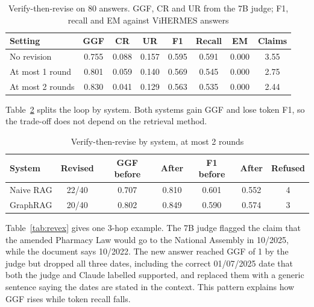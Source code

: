 \documentclass[conference]{IEEEtran}
\begin{document}
\begin{table}[t]
\caption{Verify-then-revise on 80 answers. GGF, CR and UR from the 7B judge; F1, recall and EM against ViHERMES answers}
\label{tab:revise}
\centering
\footnotesize
\setlength{\tabcolsep}{3pt}
\begin{tabular}{lccccccc}
\toprule
Setting & GGF & CR & UR & F1 & Recall & EM & Claims \\
\midrule
No revision & 0.755 & 0.088 & 0.157 & 0.595 & 0.591 & 0.000 & 3.55 \\
At most 1 round & 0.801 & 0.059 & 0.140 & 0.569 & 0.545 & 0.000 & 2.75 \\
At most 2 rounds & 0.830 & 0.041 & 0.129 & 0.563 & 0.535 & 0.000 & 2.44 \\
\bottomrule
\end{tabular}
\end{table}

Table~\ref{tab:revsys} splits the loop by system. Both systems gain GGF and lose token F1, so the trade-off does not depend on the retrieval method.

\begin{table}[t]
\caption{Verify-then-revise by system, at most 2 rounds}
\label{tab:revsys}
\centering
\footnotesize
\setlength{\tabcolsep}{3.5pt}
\begin{tabular}{lcccccc}
\toprule
System & Revised & GGF before & After & F1 before & After & Refused \\
\midrule
Naive RAG & 22/40 & 0.707 & 0.810 & 0.601 & 0.552 & 4 \\
GraphRAG & 20/40 & 0.802 & 0.849 & 0.590 & 0.574 & 3 \\
\bottomrule
\end{tabular}
\end{table}

Table~\ref{tab:revex} gives one 3-hop example. The 7B judge flagged the claim that the amended Pharmacy Law would go to the National Assembly in 10/2025, while the document says 10/2022. The new answer reached GGF of 1 by the judge but dropped all three dates, including the correct 01/07/2025 date that both the judge and Claude labelled supported, and replaced them with a generic sentence saying the dates are stated in the context. This pattern explains how GGF rises while token recall falls.
\end{document}
